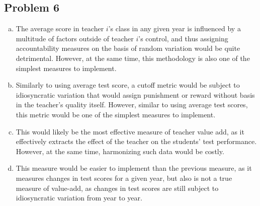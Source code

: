 \documentclass[12pt]{extarticle}
\begin{document}
  \subsection{Problem 6}%
  \begin{enumerate}[(a)]
    \item The average score in teacher $i$'s class in any given year is influenced by a multitude of factors outside of teacher $i$'s control, and thus assigning accountability measures on the basis of random variation would be quite detrimental. However, at the same time, this methodology is also one of the simplest measures to implement.
    \item Similarly to using average test score, a cutoff metric would be subject to idiosyncratic variation that would assign punishment or reward without basis in the teacher's quality itself. However, similar to using average test scores, this metric would be one of the simplest measures to implement.
    \item This would likely be the most effective measure of teacher value add, as it effectively extracts the effect of the teacher on the students' test performance. However, at the same time, harmonizing such data would be costly.
    \item This measure would be easier to implement than the previous measure, as it measures changes in test scores for a given year, but also is not a true measure of value-add, as changes in test scores are still subject to idiosyncratic variation from year to year.
  \end{enumerate}
\end{document}
